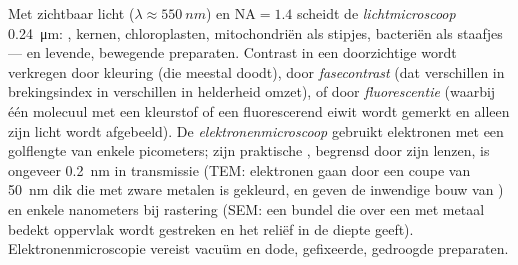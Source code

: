 \begin{proposition}\label{prop:b1:cell-unit-of-life:microscopes}
Met zichtbaar licht ($\lambda \approx \qty{550}{nm}$) en $\mathrm{NA} = 1.4$
scheidt de \emph{lichtmicroscoop} \qty{0.24}{\micro m}:
, kernen, chloroplasten, mitochondriën als stipjes, bacteriën als
staafjes --- en levende, bewegende preparaten. Contrast in een doorzichtige 
wordt verkregen door kleuring (die meestal doodt), door \emph{fasecontrast}
(dat verschillen in brekingsindex in verschillen in helderheid omzet), of door
\emph{fluorescentie} (waarbij één molecuul met een kleurstof of een fluorescerend
eiwit wordt gemerkt en alleen zijn licht wordt afgebeeld). De
\emph{elektronenmicroscoop} gebruikt elektronen met
een golflengte van enkele picometers; zijn praktische , begrensd
door zijn lenzen, is ongeveer \qty{0.2}{nm} in transmissie (TEM: elektronen gaan
door een coupe van \qty{50}{nm} dik die met zware metalen is gekleurd, en geven de
inwendige bouw van ) en enkele nanometers bij rastering (SEM: een bundel
die over een met metaal bedekt oppervlak wordt gestreken en het reliëf in de
diepte geeft). Elektronenmicroscopie vereist vacuüm en dode, gefixeerde,
gedroogde preparaten.
\end{proposition}

